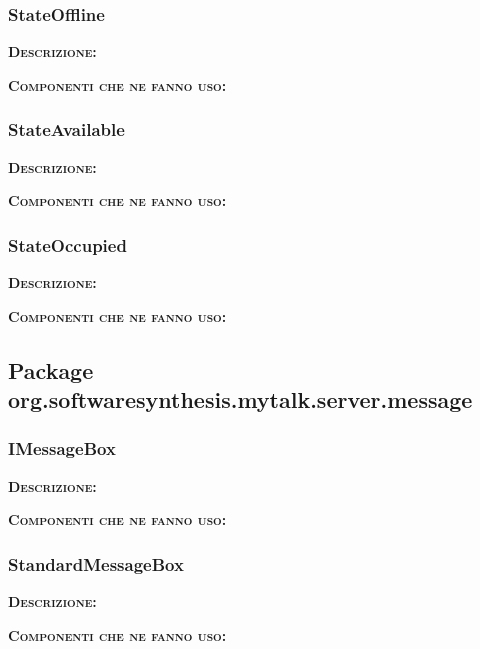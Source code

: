 \subsubsection{StateOffline}
\begin{description}
	\item{\scshape\bfseries Descrizione:} 
	\item{\scshape\bfseries Componenti che ne fanno uso:} 
\end{description}

\subsubsection{StateAvailable}
\begin{description}
	\item{\scshape\bfseries Descrizione:} 
	\item{\scshape\bfseries Componenti che ne fanno uso:} 
\end{description}

\subsubsection{StateOccupied}
\begin{description}
	\item{\scshape\bfseries Descrizione:} 
	\item{\scshape\bfseries Componenti che ne fanno uso:} 
\end{description}

\subsection{Package org.softwaresynthesis.mytalk.server.message}
\subsubsection{IMessageBox}
\begin{description}
	\item{\scshape\bfseries Descrizione:} 
	\item{\scshape\bfseries Componenti che ne fanno uso:} 
\end{description}

\subsubsection{StandardMessageBox}
\begin{description}
	\item{\scshape\bfseries Descrizione:} 
	\item{\scshape\bfseries Componenti che ne fanno uso:} 
\end{description}

